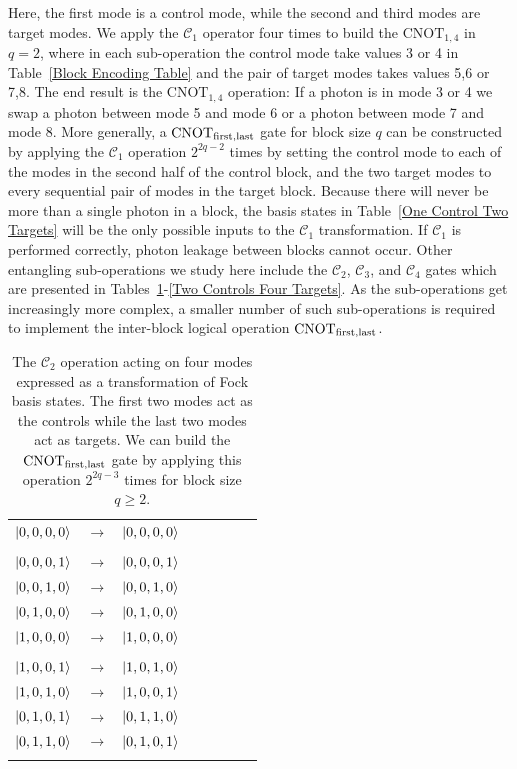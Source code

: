 \documentclass[aps,pra,twocolumn,superscriptaddress,floatfix,10pt]{revtex4}
\begin{document}
Here, the first mode is a control mode, while the second and third modes are target modes. We apply the $\mathcal{C}_1$  operator four times to build the $\mbox{CNOT}_{1,4}$ in $q=2$, where in each sub-operation the control mode take values 3 or 4 in Table~\ref{Block Encoding Table} and the pair of target modes takes values 5,6 or 7,8. The end result is the $\mbox{CNOT}_{1,4}$ operation: If a photon is in mode 3 or 4 we swap a photon between mode 5 and mode 6 or a photon between mode 7 and mode 8. More generally, a $\mbox{CNOT}_{\rm first,last}$ gate for block size $q$ can be constructed by applying the $\mathcal{C}_1$  operation $2^{2q-2}$ times by setting the control mode to each of the modes in the second half of the control block, and the two target modes to every sequential pair of modes in the target block. Because there will never be more than a single photon in a block, the basis states in Table~\ref{One Control Two Targets} will be the only possible inputs to the $\mathcal{C}_1$  transformation. If $\mathcal{C}_1$ is performed correctly, photon leakage between blocks cannot occur. Other entangling sub-operations we study here include the $\mathcal{C}_2$, $\mathcal{C}_3$, and $\mathcal{C}_4$ gates which are presented in Tables~\ref{Two Controls Two Targets}-\ref{Two Controls Four Targets}. As the sub-operations get increasingly more complex, a smaller number of such sub-operations is required to implement the inter-block logical operation  $\mbox{CNOT}_{\rm first,last}$.
\begin {table}[h]
\begin{center}
	\begin{tabular}{l*{6}{c}r} 
		$\ket{0,0,0,0}$  &  $\rightarrow$ & $\ket{0,0,0,0}$ \\ \\
		$\ket{0,0,0,1}$  & $\rightarrow$ & $\ket{0,0,0,1}$ \\
		$\ket{0,0,1,0}$ & $\rightarrow$ & $\ket{0,0,1,0}$ \\
		$\ket{0,1,0,0}$ & $\rightarrow$ & $\ket{0,1,0,0} $ \\ 
		$\ket{1,0,0,0}$ & $\rightarrow$ & $\ket{1,0,0,0} $ \\ \\
		$\ket{1,0,0,1}$  & $\rightarrow$ & $\ket{1,0,1,0}$ \\
		$\ket{1,0,1,0}$ & $\rightarrow$ & $\ket{1,0,0,1}$ \\
		$\ket{0,1,0,1}$ & $\rightarrow$ & $\ket{0,1,1,0} $ \\ 
		$\ket{0,1,1,0}$ & $\rightarrow$ & $\ket{0,1,0,1} $ \\ \\
	\end{tabular}
	\caption{ \label{Two Controls Two Targets} The $\mathcal{C}_2$  operation acting on four modes expressed as a transformation of Fock basis states. The first two modes act as the controls while the last two modes act as targets. We can build the $\mbox{CNOT}_{\rm first,last}$ gate by applying this operation $2^{2 q - 3}$ times for block size $ q \ge 2 $.}
\end{center}
\end{table}
\end{document}
